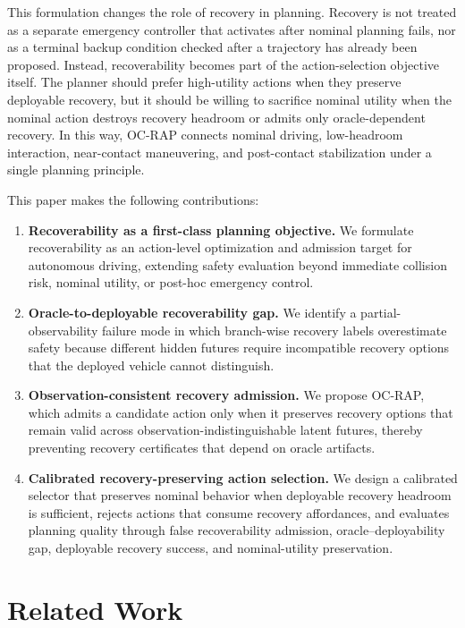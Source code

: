\documentclass[conference]{IEEEtran}
\begin{document}
This formulation changes the role of recovery in planning.  Recovery is not treated as a separate emergency controller that activates after nominal planning fails, nor as a terminal backup condition checked after a trajectory has already been proposed.  Instead, recoverability becomes part of the action-selection objective itself.  The planner should prefer high-utility actions when they preserve deployable recovery, but it should be willing to sacrifice nominal utility when the nominal action destroys recovery headroom or admits only oracle-dependent recovery.  In this way, OC-RAP connects nominal driving, low-headroom interaction, near-contact maneuvering, and post-contact stabilization under a single planning principle.

This paper makes the following contributions:
\begin{enumerate}[leftmargin=*]
    \item \textbf{Recoverability as a first-class planning objective.}
    We formulate recoverability as an action-level optimization and admission target for autonomous driving, extending safety evaluation beyond immediate collision risk, nominal utility, or post-hoc emergency control.

    \item \textbf{Oracle-to-deployable recoverability gap.}
    We identify a partial-observability failure mode in which branch-wise recovery labels overestimate safety because different hidden futures require incompatible recovery options that the deployed vehicle cannot distinguish.

    \item \textbf{Observation-consistent recovery admission.}
    We propose OC-RAP, which admits a candidate action only when it preserves recovery options that remain valid across observation-indistinguishable latent futures, thereby preventing recovery certificates that depend on oracle artifacts.

    \item \textbf{Calibrated recovery-preserving action selection.}
    We design a calibrated selector that preserves nominal behavior when deployable recovery headroom is sufficient, rejects actions that consume recovery affordances, and evaluates planning quality through false recoverability admission, oracle--deployability gap, deployable recovery success, and nominal-utility preservation.
\end{enumerate}



\section{Related Work}
\end{document}

